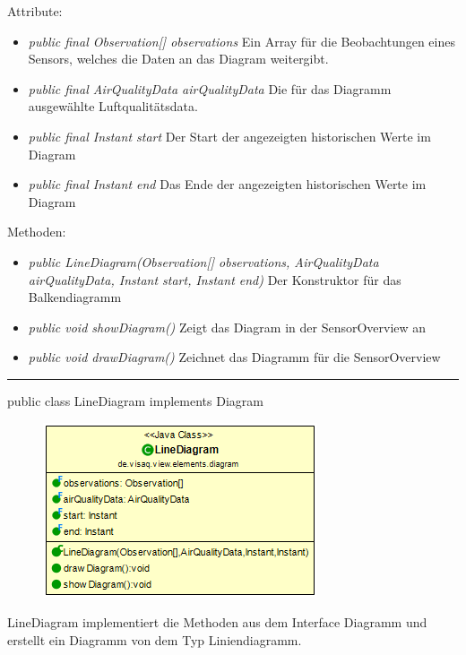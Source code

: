 Attribute:
\begin{itemize} 
    \item \emph{public final Observation[] observations} Ein Array für die Beobachtungen eines Sensors, welches die Daten an das Diagram weitergibt.
    \item \emph{public final AirQualityData airQualityData} Die für das Diagramm ausgewählte Luftqualitätsdata.
    \item \emph{public final Instant start} Der Start der angezeigten historischen Werte im Diagram
    \item \emph{public final Instant end} Das Ende der angezeigten historischen Werte im Diagram
\end{itemize}   
Methoden:
\begin{itemize}      
    \item \emph{public LineDiagram(Observation[] observations, AirQualityData airQualityData, Instant start, Instant end)} Der Konstruktor für das Balkendiagramm
    \item \emph{public void showDiagram()} Zeigt das Diagram in der SensorOverview an
    \item \emph{public void drawDiagram()} Zeichnet das Diagramm für die SensorOverview
\end{itemize}

\rule{\textwidth}{0.4pt} 
public class LineDiagram implements Diagram

\begin{minipage}{0.3\textwidth}
    \begin{figure}[H]
        \includegraphics[scale = 0.5]{media/frontend/view/de.view.elements.diagram/LineDiagram_Class.png}
    \end{figure}
    \end{minipage} \hfill
    \begin{minipage}{0.6\textwidth}
LineDiagram implementiert die Methoden aus dem Interface Diagramm und erstellt ein Diagramm von dem Typ Liniendiagramm.
\end{minipage}

